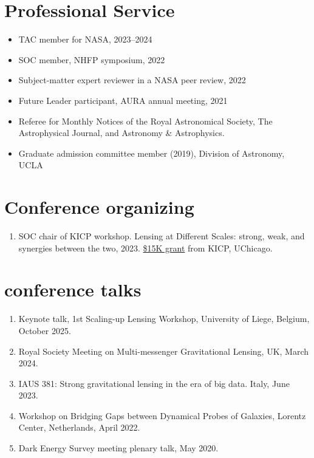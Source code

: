 \documentclass[margin, line]{res}
\begin{document}
\begin{resume}
\section{\sc Professional Service}
\begin{itemize}
\item TAC member for NASA, 2023--2024
\item SOC member, NHFP symposium, 2022
\item Subject-matter expert reviewer in a NASA peer review, 2022
\item Future Leader participant, AURA annual meeting, 2021
\item Referee for Monthly Notices of the Royal Astronomical Society, The Astrophysical Journal, and Astronomy \& Astrophysics.
\item Graduate admission committee member (2019), Division of Astronomy, UCLA
\end{itemize}

\section{\sc Conference organizing}
\begin{enumerate}
	\item SOC chair of KICP workshop. Lensing at Different Scales: strong, weak, and synergies between the two, 2023. \underline{\$15K grant} from KICP, UChicago.
\end{enumerate}

\section{ conference talks}
\begin{enumerate}
	\item Keynote talk, 1st Scaling-up Lensing Workshop, University of Liege, Belgium, October 2025.
	\item Royal Society Meeting on Multi-messenger Gravitational Lensing, UK, March 2024.
	\item IAUS 381: Strong gravitational lensing in the era of big data. Italy, June 2023.
	\item Workshop on Bridging Gaps between Dynamical Probes of Galaxies, Lorentz Center, Netherlands, April 2022.
	\item Dark Energy Survey meeting plenary talk, May 2020.	 %
\end{enumerate}


\end{resume}
\end{document}
